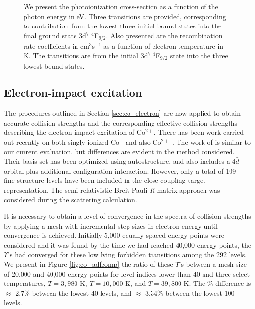 \begin{figure}
\begin{subfigure}{0.45\textwidth}
    \end{subfigure}
\caption{We present the photoionization cross-section as a function of the photon energy in eV. Three transitions are provided, corresponding to contribution from the lowest three initial bound states into the final ground state 3d$^7$ $^4$F$_{9/2}$. Also presented are the recombination rate coefficients in cm$^3$s$^{-1}$ as a function of electron temperature in K. The transitions are from the initial  3d$^7$ $^4$F$_{9/2}$ state into the three lowest bound states. \label{fig:co_rates}}
\end{figure}
%

\newpage

\subsection{Electron-impact excitation}
The procedures outlined in Section \ref{sec:co_electron} are now applied to obtain accurate collision strengths and the corresponding effective collision strengths describing the electron-impact excitation of Co$^{2+}$. There has been work carried out recently on both singly ionized Co$^{+}$ \citep{2016MNRAS.456.1974S} and also Co$^{2+}$ \citep{2016MNRAS.tmp..556S}. The work of \citet{2016MNRAS.tmp..556S} is similar to our current evaluation, but differences are evident in the method considered. Their basis set has been optimized using {\sc autostructure}, and also includes a $4\bar{d}$ orbital plus additional configuration-interaction. However, only a total of 109 fine-structure levels have been included in the close coupling target representation. The semi-relativistic Breit-Pauli $R$-matrix approach was considered during the scattering calculation.

It is necessary to obtain a level of convergence in the spectra of collision strengths by applying a mesh with incremental step sizes in electron energy until convergence is achieved. Initially 5,000 equally spaced energy points were considered and it was found by the time we had reached 40,000 energy points, the $\Upsilon$'s had converged for these low lying forbidden transitions among the 292 levels. We present in Figure \ref{fig:co_adfcomp} the ratio of these $\Upsilon$'s between a mesh size of 20,000 and 40,000 energy points for level indices lower than 40 and three select temperatures, $T=3,980$ K, $T=10,000$ K, and $T=39,800$ K. The $\%$ difference is $\approx$ 2.7\% between the lowest 40 levels, and $\approx$ 3.34\% between the lowest 100 levels. 

